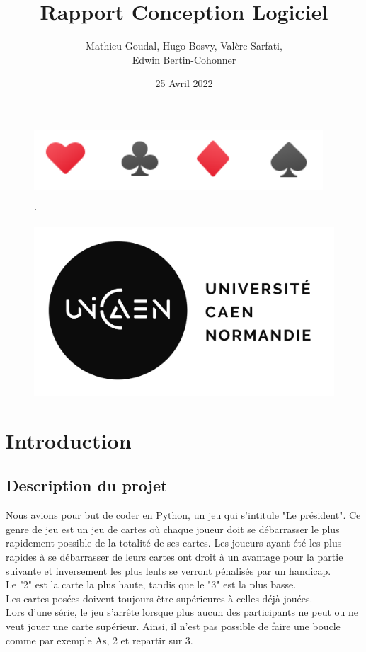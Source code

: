 \documentclass[french,12pt]{article}
\title{Rapport Conception Logiciel}
\author{Mathieu Goudal, Hugo Bosvy, Valère Sarfati, \\Edwin Bertin-Cohonner}
\date{25 Avril 2022}
\begin{document}
\maketitle

\begin{figure}[h]
	\begin{center}
		\includegraphics[scale=0.5]{img/cartes.png}	
	\end{center}
\end{figure}

\begin{figure}`
	\begin{center}
		\includegraphics[scale=0.7]{img/unicaen.png}	
	\end{center}
\end{figure}

\thispagestyle{empty}
\setcounter{page}{0}
\newpage

\tableofcontents
\newpage

\section{Introduction}

\subsection{Description du projet}

Nous avions pour but de coder en Python, un jeu qui s'intitule "Le président". Ce genre de jeu est un jeu de cartes où chaque joueur doit se débarrasser le plus rapidement possible de la totalité de ses cartes. Les joueurs ayant été les plus rapides à se débarrasser de leurs cartes ont droit à un avantage pour la partie suivante et inversement les plus lents se verront pénalisés par un handicap.\\
Le "2" est la carte la plus haute, tandis que le "3" est la plus basse. \\
Les cartes posées doivent toujours être supérieures à celles déjà jouées.\\
Lors d’une série, le jeu s’arrête lorsque plus aucun des participants ne peut ou ne veut jouer une carte supérieur. Ainsi, il n’est pas possible de faire une boucle comme par exemple As, 2 et repartir sur 3.
\end{document}
